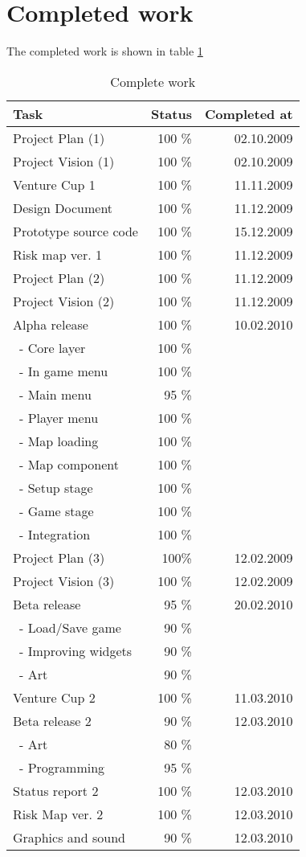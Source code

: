 \documentclass[12pt,a4paper]{article}
\begin{document}
\section{Completed work}

The completed work is shown in table \ref{tab:compwork}

\begin{table}[h!]
\small
\begin{center}
\begin{tabular}{ l | r | r}
Task					&Status	&Completed at\\\hline\hline
Project Plan (1)			&100 \%	&02.10.2009\\
Project Vision (1)		&100 \%	&02.10.2009\\
Venture Cup 1			&100 \%	&11.11.2009\\
Design Document		&100 \%	&11.12.2009\\
Prototype source code	&100 \%	&15.12.2009\\
Risk map ver. 1			&100 \%	&11.12.2009\\
Project Plan (2)			&100 \%	&11.12.2009\\
Project Vision (2)		&100 \%	&11.12.2009\\
Alpha release			&100 \%	&10.02.2010\\
\ - Core layer			&100 \%	&\\
\ - In game menu		&100 \%	&\\
\ - Main menu			&95 \%	&\\
\ - Player menu			&100 \%	&\\
\ - Map loading			&100 \%	&\\
\ - Map component		&100 \%	&\\
\ - Setup stage			&100 \%	&\\
\ - Game stage			&100 \%	&\\
\ - Integration			&100 \%	&\\
Project Plan (3) 		&100\%	&12.02.2009\\
Project Vision (3)		&100 \%	&12.02.2009\\
Beta release			&95 \%	&20.02.2010\\
\ - Load/Save game		&90 \%	&\\
\ - Improving widgets	&90 \%	&\\
\ - Art				&90 \%	&\\
Venture Cup 2			&100 \%	&11.03.2010\\
Beta release 2			&90 \%	&12.03.2010\\
\ - Art				&80 \%	&\\
\ - Programming		&95 \%	&\\
Status report 2			&100 \%	&12.03.2010\\
Risk Map ver. 2		&100 \%	&12.03.2010\\
Graphics and sound		&90 \%	&12.03.2010
\end{tabular}
\end{center}
\caption{Complete work}
\label{tab:compwork}
\end{table}
\end{document}
